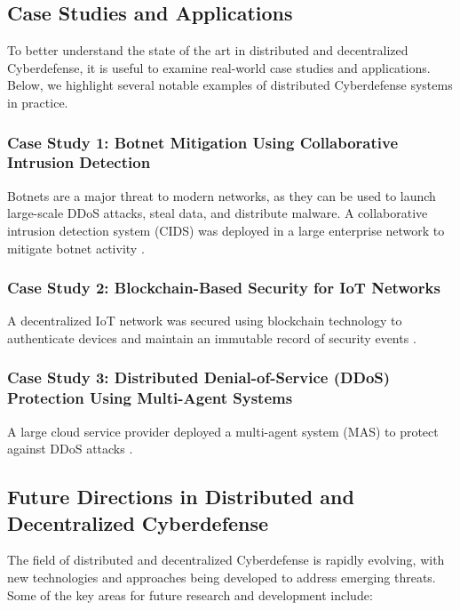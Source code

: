 \subsection{Case Studies and Applications}

To better understand the state of the art in distributed and decentralized Cyberdefense, it is useful to examine real-world case studies and applications. Below, we highlight several notable examples of distributed Cyberdefense systems in practice.

\subsubsection{Case Study 1: Botnet Mitigation Using Collaborative Intrusion Detection}

Botnets are a major threat to modern networks, as they can be used to launch large-scale DDoS attacks, steal data, and distribute malware. A collaborative intrusion detection system (CIDS) was deployed in a large enterprise network to mitigate botnet activity \cite{Vasilomanolakis2015}.

\subsubsection{Case Study 2: Blockchain-Based Security for IoT Networks}

A decentralized IoT network was secured using blockchain technology to authenticate devices and maintain an immutable record of security events \cite{Dorri2017}.

\subsubsection{Case Study 3: Distributed Denial-of-Service (DDoS) Protection Using Multi-Agent Systems}

A large cloud service provider deployed a multi-agent system (MAS) to protect against DDoS attacks \cite{Kotenko2007}.

\subsection{Future Directions in Distributed and Decentralized Cyberdefense}

The field of distributed and decentralized Cyberdefense is rapidly evolving, with new technologies and approaches being developed to address emerging threats. Some of the key areas for future research and development include:

